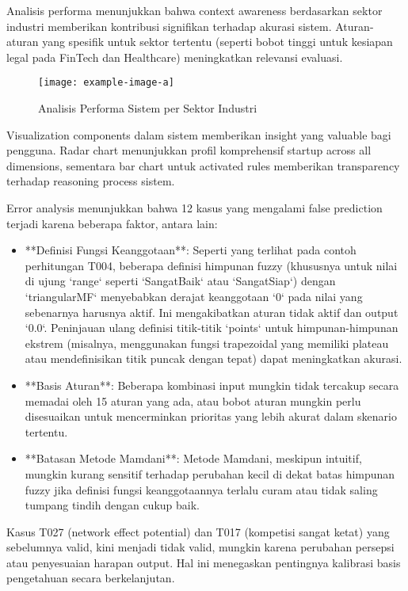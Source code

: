 \documentclass[12pt,a4paper]{article}
\begin{document}
Analisis performa menunjukkan bahwa context awareness berdasarkan sektor industri memberikan kontribusi signifikan terhadap akurasi sistem. Aturan-aturan yang spesifik untuk sektor tertentu (seperti bobot tinggi untuk kesiapan legal pada FinTech dan Healthcare) meningkatkan relevansi evaluasi.

\begin{figure}[htbp] %
    \centering
    \texttt{[image: example-image-a]} %
    \caption{Analisis Performa Sistem per Sektor Industri}
    \label{fig:sector-analysis}
\end{figure}

Visualization components dalam sistem memberikan insight yang valuable bagi pengguna. Radar chart menunjukkan profil komprehensif startup across all dimensions, sementara bar chart untuk activated rules memberikan transparency terhadap reasoning process sistem.

Error analysis menunjukkan bahwa 12 kasus yang mengalami false prediction terjadi karena beberapa faktor, antara lain:
\begin{itemize}
    \item **Definisi Fungsi Keanggotaan**: Seperti yang terlihat pada contoh perhitungan T004, beberapa definisi himpunan fuzzy (khususnya untuk nilai di ujung `range` seperti `SangatBaik` atau `SangatSiap`) dengan `triangularMF` menyebabkan derajat keanggotaan `0` pada nilai yang sebenarnya harusnya aktif. Ini mengakibatkan aturan tidak aktif dan output `0.0`. Peninjauan ulang definisi titik-titik `points` untuk himpunan-himpunan ekstrem (misalnya, menggunakan fungsi trapezoidal yang memiliki plateau atau mendefinisikan titik puncak dengan tepat) dapat meningkatkan akurasi.
    \item **Basis Aturan**: Beberapa kombinasi input mungkin tidak tercakup secara memadai oleh 15 aturan yang ada, atau bobot aturan mungkin perlu disesuaikan untuk mencerminkan prioritas yang lebih akurat dalam skenario tertentu.
    \item **Batasan Metode Mamdani**: Metode Mamdani, meskipun intuitif, mungkin kurang sensitif terhadap perubahan kecil di dekat batas himpunan fuzzy jika definisi fungsi keanggotaannya terlalu curam atau tidak saling tumpang tindih dengan cukup baik.
\end{itemize}
Kasus T027 (network effect potential) dan T017 (kompetisi sangat ketat) yang sebelumnya valid, kini menjadi tidak valid, mungkin karena perubahan persepsi atau penyesuaian harapan output. Hal ini menegaskan pentingnya kalibrasi basis pengetahuan secara berkelanjutan.
\end{document}
